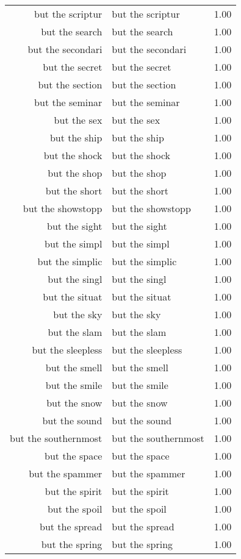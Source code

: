 \begin{table}[ht]
\begin{tabular}{rlr}
  but the scriptur & but the scriptur & 1.00 \\ 
  but the search & but the search & 1.00 \\ 
  but the secondari & but the secondari & 1.00 \\ 
  but the secret & but the secret & 1.00 \\ 
  but the section & but the section & 1.00 \\ 
  but the seminar & but the seminar & 1.00 \\ 
  but the sex & but the sex & 1.00 \\ 
  but the ship & but the ship & 1.00 \\ 
  but the shock & but the shock & 1.00 \\ 
  but the shop & but the shop & 1.00 \\ 
  but the short & but the short & 1.00 \\ 
  but the showstopp & but the showstopp & 1.00 \\ 
  but the sight & but the sight & 1.00 \\ 
  but the simpl & but the simpl & 1.00 \\ 
  but the simplic & but the simplic & 1.00 \\ 
  but the singl & but the singl & 1.00 \\ 
  but the situat & but the situat & 1.00 \\ 
  but the sky & but the sky & 1.00 \\ 
  but the slam & but the slam & 1.00 \\ 
  but the sleepless & but the sleepless & 1.00 \\ 
  but the smell & but the smell & 1.00 \\ 
  but the smile & but the smile & 1.00 \\ 
  but the snow & but the snow & 1.00 \\ 
  but the sound & but the sound & 1.00 \\ 
  but the southernmost & but the southernmost & 1.00 \\ 
  but the space & but the space & 1.00 \\ 
  but the spammer & but the spammer & 1.00 \\ 
  but the spirit & but the spirit & 1.00 \\ 
  but the spoil & but the spoil & 1.00 \\ 
  but the spread & but the spread & 1.00 \\ 
  but the spring & but the spring & 1.00 \\ 

\end{tabular}
\end{table}
